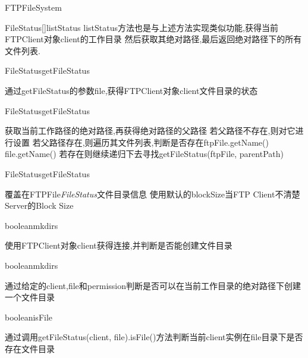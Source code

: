 \begin{XeClass}{FTPFileSystem}
\begin{XeMethod}{\XePrivate}{FileStatus[]}{listStatus}
 listStatus方法也是与上述方法实现类似功能,获得当前FTPClient对象client的工作目录
 然后获取其绝对路径,最后返回绝对路径下的所有文件列表.

    \end{XeMethod}

    \begin{XeMethod}{\XePublic}{FileStatus}{getFileStatus}
         
 通过getFileStatus的参数file,获得FTPClient对象client文件目录的状态

    \end{XeMethod}

    \begin{XeMethod}{\XePrivate}{FileStatus}{getFileStatus}
         
 获取当前工作路径的绝对路径,再获得绝对路径的父路径
 若父路径不存在,则对它进行设置
 若父路径存在,则遍历其文件列表,判断是否存在ftpFile.getName()  file.getName()
 若存在则继续递归下去寻找getFileStatus(ftpFile, parentPath)

    \end{XeMethod}

    \begin{XeMethod}{\XePrivate}{FileStatus}{getFileStatus}
         
 覆盖在FTPFile\emph{FileStatus}文件目录信息
 使用默认的blockSize当FTP Client不清楚Server的Block Size

    \end{XeMethod}

    \begin{XeMethod}{\XePublic}{boolean}{mkdirs}
         
 使用FTPClient对象client获得连接,并判断是否能创建文件目录

    \end{XeMethod}

    \begin{XeMethod}{\XePrivate}{boolean}{mkdirs}
         
 通过给定的client,file和permission判断是否可以在当前工作目录的绝对路径下创建一个文件目录

    \end{XeMethod}

    \begin{XeMethod}{\XePrivate}{boolean}{isFile}
         
 通过调用getFileStatus(client, file).isFile()方法判断当前client实例在file目录下是否存在文件目录

    \end{XeMethod}


\end{XeClass}
